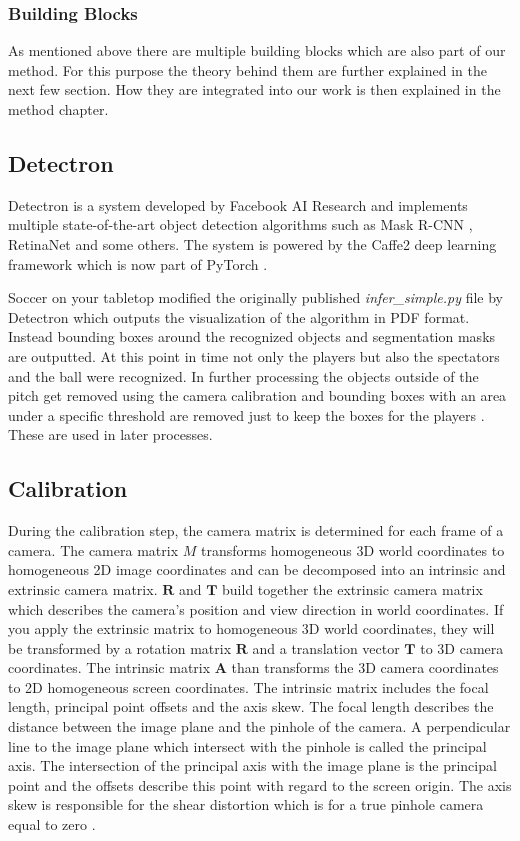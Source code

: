 \subsubsection{Building Blocks}
As mentioned above there are multiple building blocks which are also part of our method. For this purpose the theory behind them are further explained in the next few section. How they are integrated into our work is then explained in the method chapter. 


\subsection{Detectron}\label{sec:detectron}
Detectron is a system developed by Facebook AI Research and implements multiple  state-of-the-art object detection algorithms such as Mask R-CNN \cite{r-cnn}, RetinaNet \cite{retinenet} and some others. The system is powered by the Caffe2 deep learning framework which is now part of PyTorch \cite{pytorch}. 

Soccer on your tabletop modified the originally published \textit{infer\_simple.py} file by Detectron which outputs the visualization of the algorithm in PDF format. Instead bounding boxes around the recognized objects and segmentation masks are outputted. At this point in time not only the players but also the spectators and the ball were recognized. In further processing the objects outside of the pitch get removed using the camera calibration and bounding boxes with an area under a specific threshold are removed just to keep the boxes for the players \cite{tabletop}. These are used in later processes. 

\subsection{Calibration}\label{sec:tablecalibration}
During the calibration step, the camera matrix is determined for each frame of a camera. The camera matrix $M$ transforms homogeneous 3D world coordinates to homogeneous 2D image coordinates and can be decomposed into an intrinsic and extrinsic camera matrix. $\mathbf{R}$ and $\mathbf{T}$ build together the extrinsic camera matrix which describes the camera's position and view direction in world coordinates. If you apply the extrinsic matrix to homogeneous 3D world coordinates, they will be transformed by a rotation matrix $\mathbf{R}$ and a translation vector $\mathbf{T}$ to 3D camera coordinates. The intrinsic matrix $\mathbf{A}$ than transforms the 3D camera coordinates to 2D homogeneous screen coordinates. The intrinsic matrix includes the focal length, principal point offsets and the axis skew. The focal length describes the distance between the image plane and the pinhole of the camera. A perpendicular line to the image plane which intersect with the pinhole is called the principal axis. The intersection of the principal axis with the image plane is the principal point and the offsets describe this point with regard to the screen origin. The axis skew is responsible for the shear distortion which is for a true pinhole camera equal to zero \cite{camerablog}.

